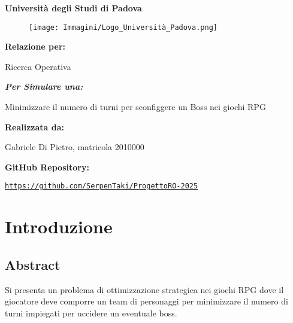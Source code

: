 \documentclass[12pt]{article}
\renewcommand{\familydefault}{\rmdefault} %
\begin{document}
\begin{titlepage}
    \centering
    {\Huge \textbf{Università degli Studi di Padova} \par}
    \vspace{1cm}
    \begin{figure}[h!]
        \centering
        \texttt{[image: Immagini/Logo\_Università\_Padova.png]}
    \end{figure}
    \vspace{0.5cm}
    {\LARGE \textbf{Relazione per:} \par}
    {\Huge Ricerca Operativa \par}
    \vspace{0.5cm}
    {\Large \textit{\textbf{Per Simulare una:}} \par}
    {\Large Minimizzare il numero di turni per sconfiggere un Boss nei giochi RPG \par}
    \vfill
    \textbf{Realizzata da:} \par
    Gabriele Di Pietro, matricola 2010000 \par
    \vspace{0.5cm}
    \textbf{GitHub Repository:} \par
    \texttt{\url{https://github.com/SerpenTaki/ProgettoRO-2025}}
\end{titlepage}
    \renewcommand{\familydefault}{\sfdefault} %
    \fontsize{10}{12}\selectfont
    \newpage
    \section{Introduzione}
    \subsection{Abstract}
    Si presenta un problema di ottimizzazione strategica nei giochi RPG dove il giocatore deve comporre un team di personaggi per minimizzare il numero di turni impiegati per uccidere un eventuale boss.\\
\end{document}

